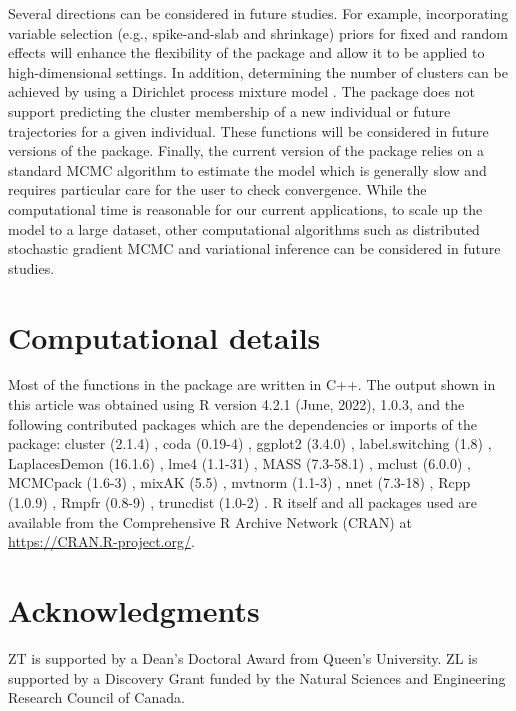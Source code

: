 Several directions can be considered in future studies. For example, incorporating variable selection (e.g., spike-and-slab and shrinkage) priors \citep{Lu2021b, Lu2021} for fixed and random effects will enhance the flexibility of the package and allow it to be applied to high-dimensional settings. In addition, determining the number of clusters can be achieved by using a Dirichlet process mixture model \citep{Escobar1994, Lu2023a, Lu2024}. The package does not support predicting the cluster membership of a new individual or future trajectories for a given individual. These functions will be considered in future versions of the package.  Finally, the current version of the  package relies on a standard MCMC algorithm to estimate the model which is generally slow and requires particular care for the user to check convergence. While the computational time is reasonable for our current applications,  to scale up the model to a large dataset, other computational algorithms such as distributed stochastic gradient MCMC \citep{Ahn2014} and variational inference \citep{Blei2017} can be considered in future studies.

\section*{Computational details}
Most of the functions in the  package are written in C++.  The output shown in this article was obtained using R version 4.2.1 (June, 2022),    1.0.3, and the following contributed packages which are the dependencies or imports of the  package: cluster (2.1.4) \citep{Maechler2022}, coda (0.19-4) \citep{Martyn2006}, ggplot2 (3.4.0) \citep{Wickham2016}, label.switching (1.8) \citep{Papastamoulis2016}, LaplacesDemon (16.1.6) \citep{Hall2022}, lme4 (1.1-31) \citep{Bates2015}, MASS (7.3-58.1) \citep{Ripley2013}, mclust (6.0.0) \citep{Fraley2006}, MCMCpack (1.6-3) \citep{Martin2011}, mixAK (5.5) \citep{Komarek2014}, mvtnorm (1.1-3) \citep{Genz2021}, nnet (7.3-18) \citep{Ripley2016}, Rcpp (1.0.9) \citep{Eddelbuettel2011}, Rmpfr (0.8-9) \citep{Maechler2022a}, truncdist (1.0-2) \citep{Novomestky2016}. R itself and all packages used are available from the Comprehensive R Archive Network (CRAN) at \url{https://CRAN.R-project.org/}.

\section*{Acknowledgments}
ZT is supported by a Dean’s Doctoral Award from Queen’s University.  ZL is supported by a Discovery Grant funded by the Natural Sciences and Engineering Research Council of Canada. 

